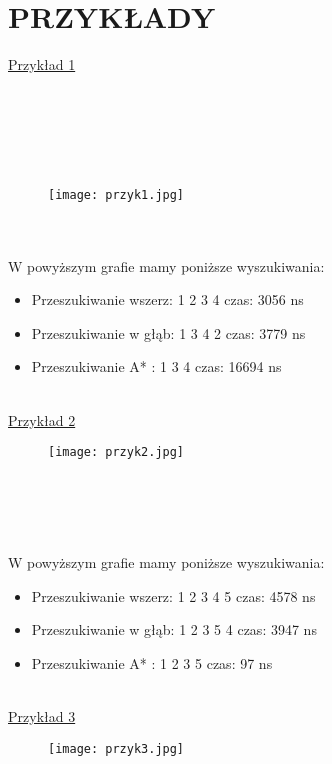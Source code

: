\documentclass[11pt]{article}
\begin{document}
\section{PRZYKŁADY} 
 \underline{Przykład 1} \\ \\ \\ \\ \\ \\
\begin{figure}[h]
\begin{center}
\texttt{[image: przyk1.jpg]}
\end{center}
\end{figure} \\ \\
W powyższym grafie mamy poniższe wyszukiwania: \\ \begin{itemize}
\item Przeszukiwanie wszerz: 1 2 3 4    czas:	3056 ns
\item Przeszukiwanie w głąb: 1 3 4 2    czas:	3779 ns
\item Przeszukiwanie A* : 1 3 4			czas:	16694 ns
\\ \\
\end{itemize}
\underline{Przykład 2}
\begin{figure}[h]
\begin{center}
\texttt{[image: przyk2.jpg]}
\end{center}
\end{figure}
\\ \\ \\ \\W powyższym grafie  mamy poniższe wyszukiwania: \\ \begin{itemize}
\item Przeszukiwanie wszerz: 1 2 3 4 5	czas:	4578 ns
\item Przeszukiwanie w głąb: 1 2 3 5 4 	czas:	3947 ns
\item Przeszukiwanie A* : 1 2 3 5		czas:	97 ns\\ \\
\end{itemize}
\underline{Przykład 3}
\begin{figure}[h]
\begin{center}
\texttt{[image: przyk3.jpg]}
\end{center}
\end{figure}
\end{document}
